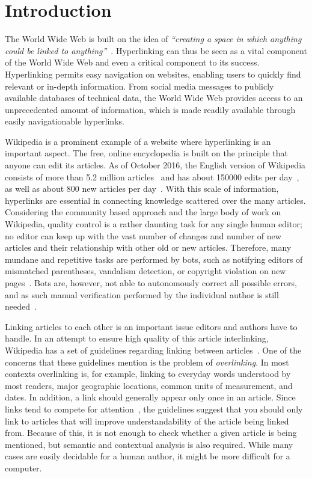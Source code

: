 \chapter{Introduction}\label{ch:introduction}
The World Wide Web is built on the idea of \emph{``creating a space in which anything could be linked to anything''}~\cite[p.~4]{Weaving-the-web}. Hyperlinking can thus be seen as a vital component of the World Wide Web and even a critical component to its success. Hyperlinking permits easy navigation on websites, enabling users to quickly find relevant or in-depth information. From social media messages to publicly available databases of technical data, the World Wide Web provides access to an unprecedented amount of information, which is made readily available through easily navigationable hyperlinks.

Wikipedia is a prominent example of a website where hyperlinking is an important aspect. The free, online encyclopedia is built on the principle that anyone can edit its articles. As of October 2016, the English version of Wikipedia consists of more than 5.2 million articles~\cite{wiki-about} and has about \num{150000} edits per day~\cite{wiki-num-edits}, as well as about 800 new articles per day~\cite{wmcharts}. With this scale of information, hyperlinks are essential in connecting knowledge scattered over the many articles. Considering the community based approach and the large body of work on Wikipedia, quality control is a rather daunting task for any single human editor; no editor can keep up with the vast number of changes and number of new articles and their relationship with other old or new articles. Therefore, many mundane and repetitive tasks are performed by bots, such as notifying editors of mismatched parentheses, vandalism detection, or copyright violation on new pages~\cite{wiki-bots}. Bots are, however, not able to autonomously correct all possible errors, and as such manual verification performed by the individual author is still needed~\cite{wiki-bot-policy}.

Linking articles to each other is an important issue editors and authors have to handle. In an attempt to ensure high quality of this article interlinking, Wikipedia has a set of guidelines regarding linking between articles~\cite{wiki-manual-of-style-overlinking}. One of the concerns that these guidelines mention is the problem of \emph{overlinking}. In most contexts overlinking is, for example, linking to everyday words understood by most readers, major geographic locations, common units of measurement, and dates. In addition, a link should generally appear only once in an article. Since links tend to compete for attention~\cite{hyperlink-structure-using-logs}, the guidelines suggest that you should only link to articles that will improve understandability of the article being linked from. Because of this, it is not enough to check whether a given article is being mentioned, but semantic and contextual analysis is also required. While many cases are easily decidable for a human author, it might be more difficult for a computer.







